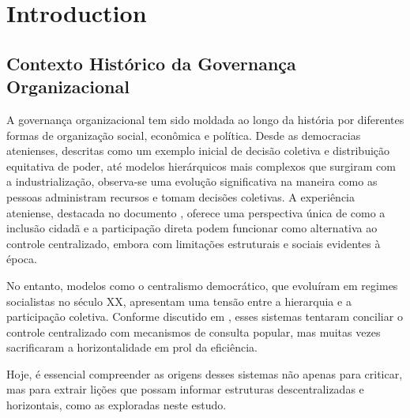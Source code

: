 
%


% 
% 

\chapter{Introduction}
\label{cha:introduction}

\section{Contexto Histórico da Governança Organizacional}
\label{sec:contexto-historico}

A governança organizacional tem sido moldada ao longo da
história por diferentes formas de organização social,
econômica e política. Desde as democracias atenienses,
descritas como um exemplo inicial de decisão coletiva e
distribuição equitativa de poder, até modelos hierárquicos
mais complexos que surgiram com a industrialização,
observa-se uma evolução significativa na maneira como as
pessoas administram recursos e tomam decisões coletivas. A
experiência ateniense, destacada no documento
\cite{AthenianDemocracyABrief}, oferece uma perspectiva
única de como a inclusão cidadã e a participação direta
podem funcionar como alternativa ao controle centralizado,
embora com limitações estruturais e sociais evidentes à
época.

No entanto, modelos como o centralismo democrático, que
evoluíram em regimes socialistas no século XX, apresentam
uma tensão entre a hierarquia e a participação coletiva.
Conforme discutido em \cite{StillaCenturyoftheChineseModel},
esses sistemas tentaram conciliar o controle centralizado
com mecanismos de consulta popular, mas muitas vezes
sacrificaram a horizontalidade em prol da eficiência.

Hoje, é essencial compreender as origens desses sistemas não
apenas para criticar, mas para extrair lições que possam
informar estruturas descentralizadas e horizontais, como as
exploradas neste estudo.


